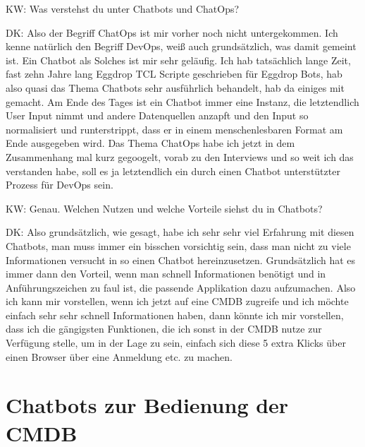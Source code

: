 \begin{list}{X:}{\setlength{\labelsep}{5mm}}
\item[KW:] Was verstehst du unter Chatbots und ChatOps?
\item[DK:] Also der Begriff ChatOps ist mir vorher noch nicht untergekommen. Ich kenne natürlich den Begriff DevOps, weiß auch grundsätzlich, was damit gemeint ist. Ein Chatbot als Solches ist mir sehr geläufig. Ich hab tatsächlich lange Zeit, fast zehn Jahre lang Eggdrop TCL Scripte geschrieben für Eggdrop Bots, hab also quasi das Thema Chatbots sehr ausführlich behandelt, hab da einiges mit gemacht. Am Ende des Tages ist ein Chatbot immer eine Instanz, die letztendlich User Input nimmt und andere Datenquellen anzapft und den Input so normalisiert und runterstrippt, dass er in einem menschenlesbaren Format am Ende ausgegeben wird. Das Thema ChatOps habe ich jetzt in dem Zusammenhang mal kurz gegoogelt, vorab zu den Interviews und so weit ich das verstanden habe, soll es ja letztendlich ein durch einen Chatbot unterstützter Prozess für DevOps sein.
\item[KW:] Genau. Welchen Nutzen und welche Vorteile siehst du in Chatbots? 
\item[DK:] Also grundsätzlich, wie gesagt, habe ich sehr sehr viel Erfahrung mit diesen Chatbots, man muss immer ein bisschen vorsichtig sein, dass man nicht zu viele Informationen versucht in so einen Chatbot hereinzusetzen. Grundsätzlich hat es immer dann den Vorteil, wenn man schnell Informationen benötigt und in Anführungszeichen zu faul ist, die passende Applikation dazu aufzumachen. Also ich kann mir vorstellen, wenn ich jetzt auf eine CMDB zugreife und ich möchte einfach sehr sehr schnell Informationen haben, dann könnte ich mir vorstellen, dass ich die gängigsten Funktionen, die ich sonst in der CMDB nutze zur Verfügung stelle, um in der Lage zu sein, einfach sich diese 5 extra Klicks über einen Browser über eine Anmeldung etc. zu machen.
\end{list}

\section*{Chatbots zur Bedienung der CMDB}

